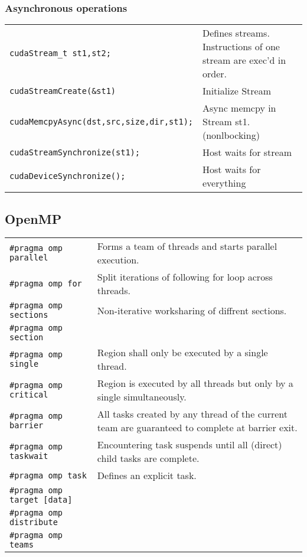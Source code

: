\documentclass[11pt]{article}
\begin{document}
\subsubsection{Asynchronous operations}
\begin{tabular}{ p{7cm} l }
	\lstinline$cudaStream_t st1,st2;$ & Defines streams. Instructions of one stream are exec'd in order.\\
	\lstinline$cudaStreamCreate(&st1)$& Initialize Stream\\
	\lstinline$cudaMemcpyAsync(dst,src,size,dir,st1);$& Async memcpy in Stream st1. (nonlbocking)\\
	\lstinline$cudaStreamSynchronize(st1);$ & Host waits for stream\\
	\lstinline$cudaDeviceSynchronize();$ & Host waits for everything \\
\end{tabular}

\subsection{OpenMP}

\begin{tabular}{ p{7cm} p{9cm} }
	\lstinline$#pragma omp parallel$ & Forms a team of threads and starts parallel execution. \\
	\lstinline$#pragma omp for$ & Split iterations of following for loop across threads.  \\
	\lstinline$#pragma omp sections$ & Non-iterative worksharing of diffrent sections. \\
	\lstinline$#pragma omp section$ & \\
	\lstinline$#pragma omp single$ & Region shall only be executed by a single thread. \\
	\lstinline$#pragma omp critical$ & Region is executed by all threads but only
		by a single simultaneously. \\
	\lstinline$#pragma omp barrier$ & All tasks created by any thread of the current
		team are guaranteed to complete at barrier exit. \\
	\lstinline$#pragma omp taskwait$ & Encountering task suspends until all (direct) child tasks are complete. \\
	\lstinline$#pragma omp task$ & Defines an explicit task. \\
	\lstinline$#pragma omp target [data]$ & \\
	\lstinline$#pragma omp distribute$ & \\
	\lstinline$#pragma omp teams$ & \\ 
\end{tabular}
\end{document}

